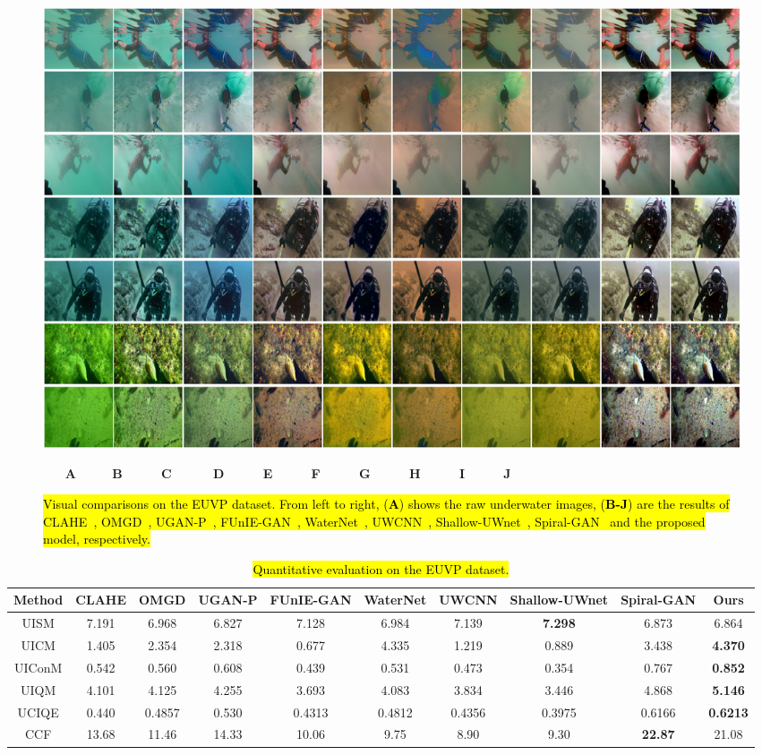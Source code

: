 \documentclass[utf8]{FrontiersinHarvard} %
\begin{document}
\begin{figure}[htbp]
\begin{center}
\includegraphics[width=1\textwidth]{FSpiralGAN_frontiers/onepicture/EUVP300.jpg}
\end{center}
$~~~~~~~~$\textbf{A}$~~~~~~~~~~~~~$\textbf{B}$~~~~~~~~~~~~~~$\textbf{C}$~~~~~~~~~~~~~~~$\textbf{D}$~~~~~~~~~~~~~~$\textbf{E}$~~~~~~~~~~~~~~$\textbf{F}$~~~~~~~~~~~~~~$\textbf{G}$~~~~~~~~~~~~~~$\textbf{H}$~~~~~~~~~~~~~~$\textbf{I}$~~~~~~~~~~~~~~$\textbf{J}
 \caption{\hl{Visual comparisons on the EUVP dataset. From left to right, (\textbf{A}) shows the raw underwater images, (\textbf{B-J}) are the results of CLAHE~\citep{109340}, OMGD~\citep{ren2021online}, UGAN-P~\citep{8460552}, FUnIE-GAN~\citep{9001231}, WaterNet~\citep{8917818}, UWCNN~\citep{2019Underwater1}, Shallow-UWnet~\citep{naik2021shallow}, Spiral-GAN~\citep{2020Underwater} and the proposed model, respectively.}\label{fig:comparison-fgan}}
\end{figure}

\begin{table}[htbp]\small
\centering
\setlength\tabcolsep{3pt}
\caption{\hl{Quantitative evaluation on the EUVP dataset.}}
\begin{tabular}{c|ccccccccc}
\hline  
Method&CLAHE&OMGD&UGAN-P&FUnIE-GAN&WaterNet&UWCNN&Shallow-UWnet&Spiral-GAN&Ours\\
\hline 
UISM&7.191&6.968&6.827&7.128&6.984&7.139&\textbf{7.298}&6.873&6.864\\
\hline 
UICM&1.405&2.354&2.318&0.677&4.335&1.219&0.889&3.438&\textbf{4.370}\\
\hline 
UIConM&0.542&0.560&0.608&0.439&0.531&0.473&0.354&0.767&\textbf{0.852}\\
\hline 
UIQM&4.101&4.125&4.255&3.693&4.083&3.834&3.446&4.868&\textbf{5.146}\\
\hline 
UCIQE&0.440&0.4857&0.530&0.4313&0.4812&0.4356&0.3975&0.6166&\textbf{0.6213}\\
\hline
CCF&13.68&11.46&14.33&10.06&9.75&8.90&9.30&\textbf{22.87}&21.08\\
\hline
\end{tabular}
\label{tbl:comparison-fgan}
\end{table}
\end{document}
